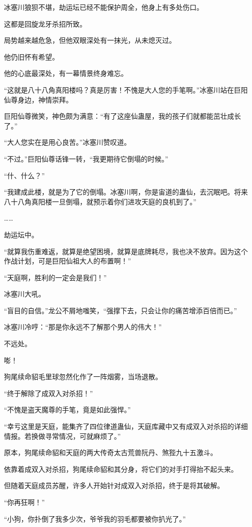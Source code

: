 \begin{this_body}
冰塞川狼狈不堪，劫运坛已经不能保护周全，他身上有多处伤口。

这都是回旋龙牙杀招所致。

局势越来越危急，但他双眼深处有一抹光，从未熄灭过。

他仍旧怀有希望。

他的心底最深处，有一幕情景终身难忘。

“这就是八十八角真阳楼吗？真是厉害！不愧是大人您的手笔啊。”冰塞川站在巨阳仙尊身边，神情崇拜。

巨阳仙尊微笑，神色颇为满意：“有了这座仙蛊屋，我的孩子们就都能茁壮成长了。”

“大人您实在是用心良苦。”冰塞川赞叹道。

“不过。”巨阳仙尊话锋一转，“我更期待它倒塌的时候。”

“什、什么？”

“我建成此楼，就是为了它的倒塌。冰塞川啊，你是宙道的蛊仙，去沉眠吧。将来八十八角真阳楼一旦倒塌，就预示着你们进攻天庭的良机到了。”

……

劫运坛中。

“就算我伤重难返，就算是绝望困境，就算是底牌耗尽，我也决不放弃。因为这个作战计划，可是巨阳仙祖大人的布置啊！”

“天庭啊，胜利的一定会是我们！”

冰塞川大吼。

“盲目的自信。”龙公不屑地嗤笑，“强撑下去，只会让你的痛苦增添百倍而已。”

冰塞川冷哼：“那是你永远不了解那个男人的伟大！”

不远处。

嘭！

狗尾续命貂毛里球忽然化作了一阵烟雾，当场退散。

“终于解除了成双入对杀招！”

“不愧是盗天魔尊的手笔，竟是如此强悍。”

“幸亏这里是天庭，能集齐了四位律道蛊仙，天庭库藏中又有成双入对杀招的详细情报。若换做寻常情况，可就麻烦了。”

原本，狗尾续命貂和天庭的两大传奇太古荒兽阮丹、煞狴九十五激斗。

依靠着成双入对杀招，狗尾续命貂和其分身，将它们的对手打得抬不起头来。

但随着天庭成员苏醒，许多人开始针对成双入对杀招，终于是将其破解。

“你再狂啊！”

“小狗，你扑倒了我多少次，爷爷我的羽毛都要被你扒光了。”


\end{this_body}
